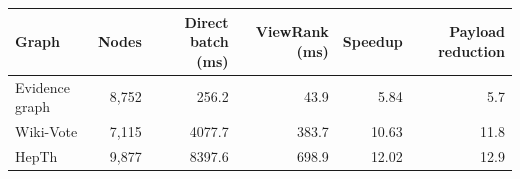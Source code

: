\begin{tabular}{lrrrrr}\toprule
Graph & Nodes & Direct batch (ms) & ViewRank (ms) & Speedup & Payload reduction \\
\midrule
Evidence graph & 8,752 & 256.2 & 43.9 & 5.84 & 5.7 \\
Wiki-Vote & 7,115 & 4077.7 & 383.7 & 10.63 & 11.8 \\
HepTh & 9,877 & 8397.6 & 698.9 & 12.02 & 12.9 \\
\bottomrule\end{tabular}

